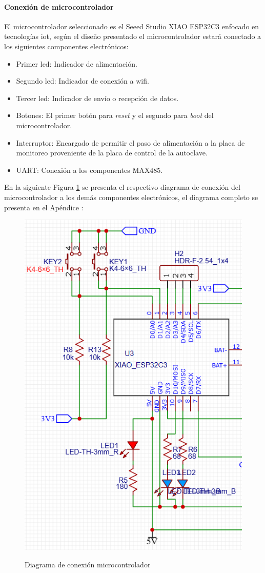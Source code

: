 \paragraph{Conexión de microcontrolador}
El microcontrolador seleccionado es el Seeed Studio XIAO ESP32C3 enfocado en tecnologías \acrshort{iot}, según el diseño presentado el microcontrolador estará conectado a los siguientes componentes electrónicos:
\begin{itemize}
    \item Primer \acrshort{led}: Indicador de alimentación.
    \item Segundo \acrshort{led}: Indicador de conexión a \acrshort{wifi}.
    \item Tercer \acrshort{led}: Indicador de envío o recepción de datos.
    \item Botones: El primer botón para \textit{reset} y el segundo para \textit{boot} del microcontrolador.
    \item Interruptor: Encargado de permitir el paso de alimentación a la placa de monitoreo proveniente de la placa de control de la autoclave.
    \item UART: Conexión a los componentes MAX485.
\end{itemize}
En la siguiente Figura \ref{fig:esp32dia} se presenta el respectivo diagrama de conexión del microcontrolador a los demás componentes electrónicos, el diagrama completo se presenta en el Apéndice :
\begin{figure}[!htb]
    \centering
    \caption{Diagrama de conexión microcontrolador} %
    {\includegraphics[width=0.5\columnwidth]{Figuras/esp32dia.png}}\\
    \label{fig:esp32dia}
\end{figure}
